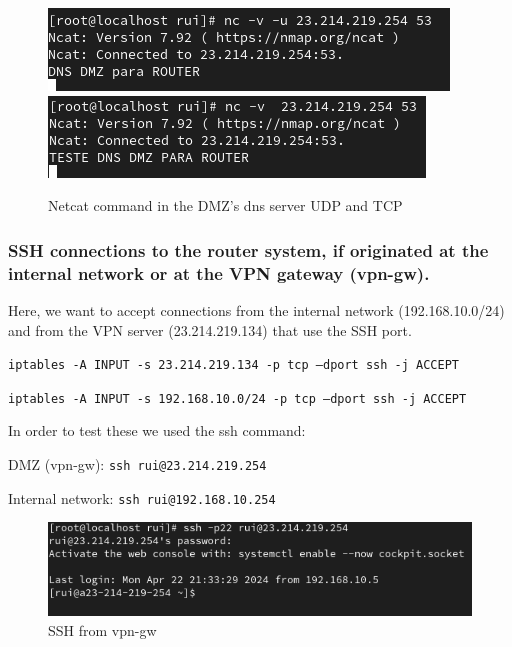 \documentclass{article}
\begin{document}
\begin{figure}[H]
    \centering
    \includegraphics[scale=0.5]{in/in_dns_dmz.png}
    \includegraphics[scale=0.5]{in/in_dns_dmz_tcp.png}
    \caption{Netcat command in the DMZ's dns server UDP and TCP}
    \label{fig:network-arc}
\end{figure}

\subsubsection{SSH connections to the router system, if originated at the internal network or at the VPN gateway (vpn-gw).} 
\texttt{}\par
Here, we want to accept connections from the internal network (192.168.10.0/24) and from the VPN server (23.214.219.134) that use the SSH port.\par
\texttt{}\par
\texttt{iptables -A INPUT -s 23.214.219.134 -p tcp --dport ssh -j ACCEPT}\par
\texttt{iptables -A INPUT -s 192.168.10.0/24 -p tcp --dport ssh -j ACCEPT}\par
\texttt{}\par

In order to test these we used the ssh command:\par
\texttt{}\par
DMZ (vpn-gw): \texttt{ssh rui@23.214.219.254} \par
Internal network: \texttt{ssh rui@192.168.10.254} \par
\texttt{}\par
\texttt{}\par


\begin{figure}[H]
    \centering
    \includegraphics[scale=0.5]{in/in_ssh_dmz.png}
    \caption{SSH from vpn-gw}
    \label{fig:network-arc}
\end{figure}
\end{document}
